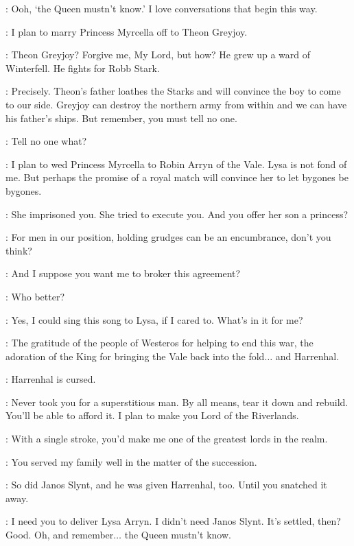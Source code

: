
\VARYS: Ooh, `the Queen mustn't know.' I love conversations that begin this way. 

\TYRION: I plan to marry Princess Myrcella off to Theon Greyjoy. 

\VARYS: Theon Greyjoy? Forgive me, My Lord, but how? He grew up a ward of Winterfell. He fights for Robb Stark. 

\TYRION: Precisely. Theon's father loathes the Starks and will convince the boy to come to our side. Greyjoy can destroy the northern army from within and we can have his father's ships. But remember, you must tell no one. 


\LITTLEFINGER: Tell no one what? 

\TYRION: I plan to wed Princess Myrcella to Robin Arryn of the Vale. Lysa is not fond of me. But perhaps the promise of a royal match will convince her to let bygones be bygones. 

\LITTLEFINGER: She imprisoned you. She tried to execute you. And you offer her son a princess? 

\TYRION: For men in our position, holding grudges can be an encumbrance, don't you think? 

\LITTLEFINGER: And I suppose you want me to broker this agreement? 

\TYRION: Who better? 

\LITTLEFINGER: Yes, I could sing this song to Lysa, if I cared to. What's in it for me? 

\TYRION: The gratitude of the people of Westeros for helping to end this war, the adoration of the King for bringing the Vale back into the fold$\ldots$ and Harrenhal. 

\LITTLEFINGER: Harrenhal is cursed. 

\TYRION: Never took you for a superstitious man. By all means, tear it down and rebuild. You'll be able to afford it. I plan to make you Lord of the Riverlands. 

\LITTLEFINGER: With a single stroke, you'd make me one of the greatest lords in the realm. 

\TYRION: You served my family well in the matter of the succession. 

\LITTLEFINGER: So did Janos Slynt, and he was given Harrenhal, too. Until you snatched it away. 

\TYRION: I need you to deliver Lysa Arryn. I didn't need Janos Slynt.  It's settled, then? Good. Oh, and remember$\ldots$ the Queen mustn't know. 


